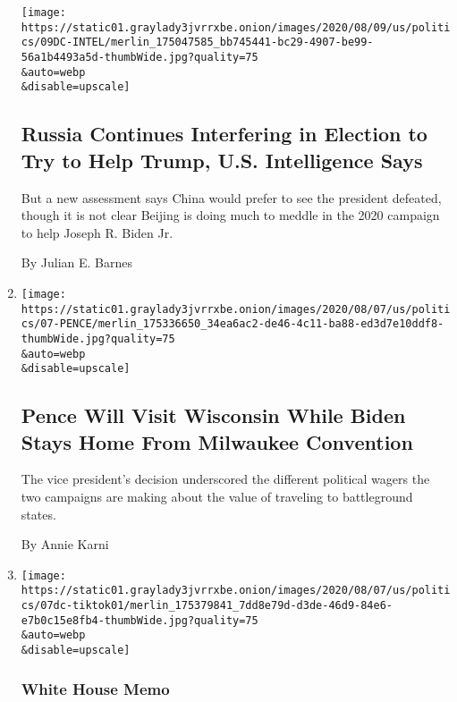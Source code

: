 \begin{enumerate}
  \texttt{[image: https://static01.graylady3jvrrxbe.onion/images/2020/08/09/us/politics/09DC-INTEL/merlin\_175047585\_bb745441-bc29-4907-be99-56a1b4493a5d-thumbWide.jpg?quality=75\\\&auto=webp\\\&disable=upscale]}

  \hypertarget{russia-continues-interfering-in-election-to-try-to-help-trump-us-intelligence-says-1}{%
  \subsection{Russia Continues Interfering in Election to Try to Help
  Trump, U.S. Intelligence
  Says}\label{russia-continues-interfering-in-election-to-try-to-help-trump-us-intelligence-says-1}}

  But a new assessment says China would prefer to see the president
  defeated, though it is not clear Beijing is doing much to meddle in
  the 2020 campaign to help Joseph R. Biden Jr.

  By Julian E. Barnes
\item
  \href{/2020/08/07/us/politics/pence-wisconsin-biden-convention.html}{}

  \texttt{[image: https://static01.graylady3jvrrxbe.onion/images/2020/08/07/us/politics/07-PENCE/merlin\_175336650\_34ea6ac2-de46-4c11-ba88-ed3d7e10ddf8-thumbWide.jpg?quality=75\\\&auto=webp\\\&disable=upscale]}

  \hypertarget{pence-will-visit-wisconsin-while-biden-stays-home-from-milwaukee-convention}{%
  \subsection{Pence Will Visit Wisconsin While Biden Stays Home From
  Milwaukee
  Convention}\label{pence-will-visit-wisconsin-while-biden-stays-home-from-milwaukee-convention}}

  The vice president's decision underscored the different political
  wagers the two campaigns are making about the value of traveling to
  battleground states.

  By Annie Karni
\item
  \href{/2020/08/07/us/politics/tiktok-security-threat.html}{}

  \texttt{[image: https://static01.graylady3jvrrxbe.onion/images/2020/08/07/us/politics/07dc-tiktok01/merlin\_175379841\_7dd8e79d-d3de-46d9-84e6-e7b0c15e8fb4-thumbWide.jpg?quality=75\\\&auto=webp\\\&disable=upscale]}

  \hypertarget{white-house-memo-1}{%
  \subsubsection{White House Memo}\label{white-house-memo-1}}


\end{enumerate}
